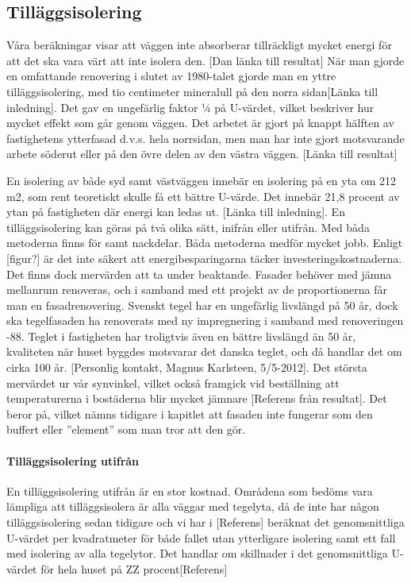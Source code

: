 \subsection{Tilläggsisolering}
Våra beräkningar visar att väggen inte absorberar tillräckligt mycket energi för att det ska vara värt att inte isolera den.  [Dan länka till resultat]
När man gjorde en omfattande renovering i slutet av 1980-talet gjorde man en yttre tilläggsisolering, med tio centimeter mineralull på den norra sidan[Länka till inledning]. Det gav en ungefärlig faktor ¼ på U-värdet, vilket beskriver hur mycket effekt som går genom väggen. Det arbetet är gjort på knappt hälften av fastighetens ytterfasad d.v.s. hela norrsidan, men man har inte gjort motsvarande arbete söderut eller på den övre delen av den västra väggen. [Länka till resultat] 

En isolering av både syd samt västväggen innebär en isolering på en yta om 212 m2, som rent teoretiskt skulle få ett bättre U-värde. Det innebär 21,8 procent av ytan på fastigheten där energi kan ledas ut. [Länka till inledning].
En tilläggsisolering kan göras på två olika sätt, inifrån eller utifrån. Med båda metoderna finns för samt nackdelar. Båda metoderna medför mycket jobb. Enligt [figur?]  är det inte säkert att energibesparingarna täcker investeringskostnaderna. Det finns dock mervärden att ta under beaktande. Fasader behöver med jämna mellanrum renoveras, och i samband med ett projekt av de proportionerna får man en fasadrenovering. Svenskt tegel har en ungefärlig livslängd på 50 år, dock ska tegelfasaden ha renoverats med ny impregnering i samband med renoveringen -88. Teglet i fastigheten har troligtvis även en bättre livslängd än 50 år, kvaliteten när huset byggdes motsvarar det danska teglet, och då handlar det om cirka 100 år. [Personlig kontakt, Magnus Karlsteen, 5/5-2012]. Det största mervärdet ur vår synvinkel, vilket också framgick vid beställning att temperaturerna i bostäderna blir mycket jämnare [Referens från resultat]. Det beror på, vilket nämns tidigare i kapitlet att fasaden inte fungerar som den buffert eller ”element” som man tror att den gör.

\paragraph{Tilläggsisolering utifrån}
En tilläggsisolering utifrån är en stor kostnad. Områdena som bedöms vara lämpliga att tilläggsisolera är alla väggar med tegelyta, då de inte har någon tilläggsisolering sedan tidigare och vi har i [Referens] beräknat det genomsnittliga U-värdet per kvadratmeter för både fallet utan ytterligare isolering samt ett fall med isolering av alla tegelytor. Det handlar om skillnader i det genomsnittliga U-värdet för hela huset på ZZ procent[Referens]

